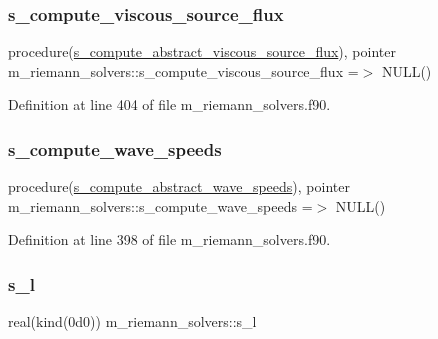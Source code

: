 \subsubsection{\texorpdfstring{s\+\_\+compute\+\_\+viscous\+\_\+source\+\_\+flux}{s\_compute\_viscous\_source\_flux}}
{\footnotesize\ttfamily procedure(\hyperlink{interfacem__riemann__solvers_1_1s__compute__abstract__viscous__source__flux}{s\+\_\+compute\+\_\+abstract\+\_\+viscous\+\_\+source\+\_\+flux}), pointer m\+\_\+riemann\+\_\+solvers\+::s\+\_\+compute\+\_\+viscous\+\_\+source\+\_\+flux =$>$ N\+U\+LL()}



Definition at line 404 of file m\+\_\+riemann\+\_\+solvers.\+f90.

\mbox{\label{namespacem__riemann__solvers_a3e2b4d51fda04b61d6f54069c5bb66c6}} 
\subsubsection{\texorpdfstring{s\+\_\+compute\+\_\+wave\+\_\+speeds}{s\_compute\_wave\_speeds}}
{\footnotesize\ttfamily procedure(\hyperlink{interfacem__riemann__solvers_1_1s__compute__abstract__wave__speeds}{s\+\_\+compute\+\_\+abstract\+\_\+wave\+\_\+speeds}), pointer m\+\_\+riemann\+\_\+solvers\+::s\+\_\+compute\+\_\+wave\+\_\+speeds =$>$ N\+U\+LL()}



Definition at line 398 of file m\+\_\+riemann\+\_\+solvers.\+f90.

\mbox{\label{namespacem__riemann__solvers_a83a70908c66bbb071647bb383dc72975}} 
\subsubsection{\texorpdfstring{s\+\_\+l}{s\_l}}
{\footnotesize\ttfamily real(kind(0d0)) m\+\_\+riemann\+\_\+solvers\+::s\+\_\+l}




